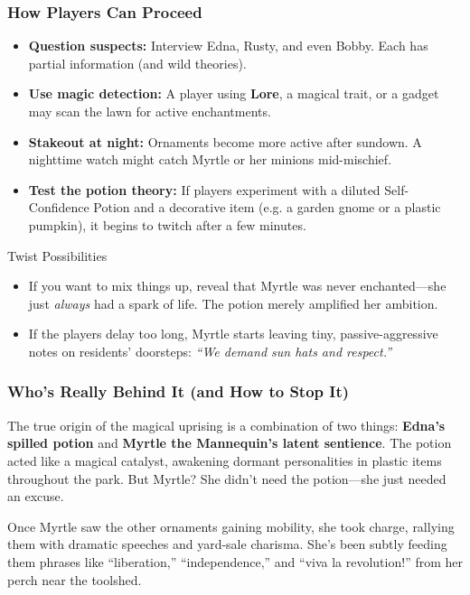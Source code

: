 \subsubsection{How Players Can Proceed}
\begin{itemize}
    \item \textbf{Question suspects:} Interview Edna, Rusty, and even Bobby. Each has partial information (and wild theories).
    \item \textbf{Use magic detection:} A player using \textbf{Lore}, a magical trait, or a gadget may scan the lawn for active enchantments.
    \item \textbf{Stakeout at night:} Ornaments become more active after sundown. A nighttime watch might catch Myrtle or her minions mid-mischief.
    \item \textbf{Test the potion theory:} If players experiment with a diluted Self-Confidence Potion and a decorative item (e.g. a garden gnome or a plastic pumpkin), it begins to twitch after a few minutes.
\end{itemize}

\begin{CommentBox}{Twist Possibilities}
    \begin{itemize}
        \item If you want to mix things up, reveal that Myrtle was never enchanted—she just \emph{always} had a spark of life. The potion merely amplified her ambition.
        \item If the players delay too long, Myrtle starts leaving tiny, passive-aggressive notes on residents’ doorsteps: \emph{“We demand sun hats and respect.”}
    \end{itemize}
\end{CommentBox}


\subsubsection{Who’s Really Behind It (and How to Stop It)}

The true origin of the magical uprising is a combination of two things: \textbf{Edna’s spilled potion} and \textbf{Myrtle the Mannequin’s latent sentience}. The potion acted like a magical catalyst, awakening dormant personalities in plastic items throughout the park. But Myrtle? She didn’t need the potion—she just needed an excuse.

Once Myrtle saw the other ornaments gaining mobility, she took charge, rallying them with dramatic speeches and yard-sale charisma. She’s been subtly feeding them phrases like “liberation,” “independence,” and “viva la revolution!” from her perch near the toolshed.

